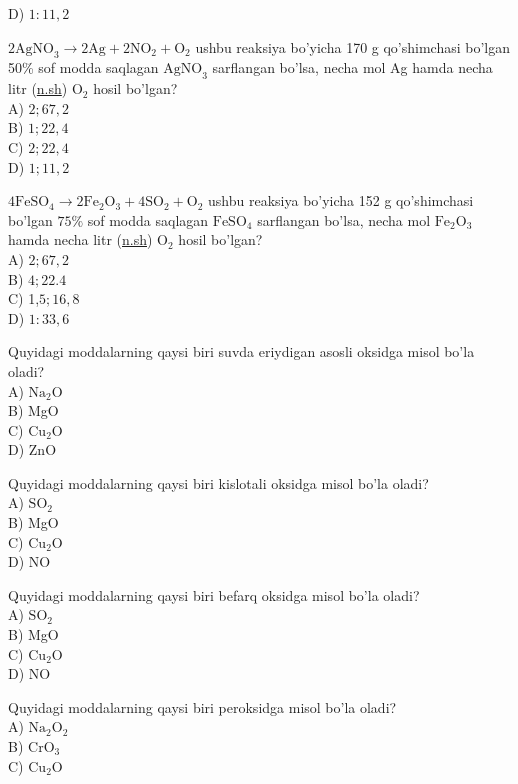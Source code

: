 D) $1: 11,2$
  \item $2 \mathrm{AgNO}_{3} \rightarrow 2 \mathrm{Ag}+2 \mathrm{NO}_{2}+\mathrm{O}_{2}$ ushbu reaksiya bo'yicha 170 g qo'shimchasi bo'lgan 50\% sof modda saqlagan $\mathrm{AgNO}_{3}$ sarflangan bo'lsa, necha mol Ag hamda necha litr (\href{http://n.sh}{n.sh}) $\mathrm{O}_{2}$ hosil bo'lgan?\\
A) $2 ; 67,2$\\
B) $1 ; 22,4$\\
C) $2 ; 22,4$\\
D) $1 ; 11,2$
  \item $4 \mathrm{FeSO}_{4} \rightarrow 2 \mathrm{Fe}_{2} \mathrm{O}_{3}+4 \mathrm{SO}_{2}+\mathrm{O}_{2}$ ushbu reaksiya bo'yicha 152 g qo'shimchasi bo'lgan $75 \%$ sof modda saqlagan $\mathrm{FeSO}_{4}$ sarflangan bo'lsa, necha mol $\mathrm{Fe}_{2} \mathrm{O}_{3}$ hamda necha litr (\href{http://n.sh}{n.sh}) $\mathrm{O}_{2}$ hosil bo'lgan?\\
A) $2 ; 67,2$\\
B) $4 ; 22.4$\\
C) 1,$5 ; 16,8$\\
D) $1: 33,6$
  \item Quyidagi moddalarning qaysi biri suvda eriydigan asosli oksidga misol bo'la oladi?\\
A) $\mathrm{Na}_{2} \mathrm{O}$\\
B) MgO\\
C) $\mathrm{Cu}_{2} \mathrm{O}$\\
D) ZnO
  \item Quyidagi moddalarning qaysi biri kislotali oksidga misol bo'la oladi?\\
A) $\mathrm{SO}_{2}$\\
B) MgO\\
C) $\mathrm{Cu}_{2} \mathrm{O}$\\
D) NO
  \item Quyidagi moddalarning qaysi biri befarq oksidga misol bo'la oladi?\\
A) $\mathrm{SO}_{2}$\\
B) MgO\\
C) $\mathrm{Cu}_{2} \mathrm{O}$\\
D) NO
  \item Quyidagi moddalarning qaysi biri peroksidga misol bo'la oladi?\\
A) $\mathrm{Na}_{2} \mathrm{O}_{2}$\\
B) $\mathrm{CrO}_{3}$\\
C) $\mathrm{Cu}_{2} \mathrm{O}$\\
